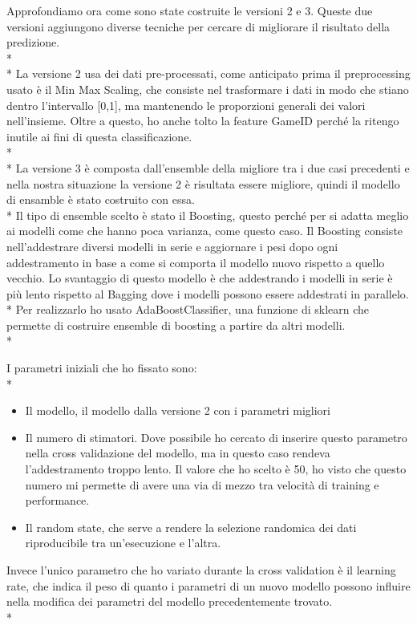 Approfondiamo ora come sono state costruite le versioni 2 e 3. Queste due versioni aggiungono diverse tecniche per cercare di migliorare il risultato della predizione.\\*\\*
La versione 2 usa dei dati pre-processati, come anticipato prima il preprocessing usato è il Min Max Scaling, che consiste nel trasformare i dati in modo che stiano dentro l'intervallo [0,1], ma mantenendo le proporzioni generali dei valori nell'insieme. Oltre a questo, ho anche tolto la feature GameID perché la ritengo inutile ai fini di questa classificazione. \\*\\*
La versione 3 è composta dall’ensemble della migliore tra i due casi precedenti e nella nostra situazione la versione 2 è risultata essere migliore, quindi il modello di ensamble è stato costruito con essa.\\*
Il tipo di ensemble scelto è stato il Boosting, questo perché per si adatta meglio ai modelli come che hanno poca varianza, come questo caso. Il Boosting consiste nell'addestrare diversi modelli in serie e aggiornare i pesi dopo ogni addestramento in base a come si comporta il modello nuovo rispetto a quello vecchio. Lo svantaggio di questo modello è che addestrando i modelli in serie è più lento rispetto al Bagging dove i modelli possono essere addestrati in parallelo.\\*
Per realizzarlo ho usato AdaBoostClassifier, una funzione di sklearn che permette di costruire ensemble di boosting a partire da altri modelli. \\*

I parametri iniziali che ho fissato sono: \\*
\begin{itemize}
	\item Il modello, il modello dalla versione 2 con i parametri migliori
	\item Il numero di stimatori. Dove possibile ho cercato di inserire questo parametro nella cross validazione del modello, ma in questo caso rendeva l'addestramento troppo lento. Il valore che ho scelto è 50, ho visto che questo numero mi permette di avere una via di mezzo tra velocità di training e performance.
	\item Il random state, che serve a rendere la selezione randomica dei dati riproducibile tra un'esecuzione e l'altra.
\end{itemize}

Invece l'unico parametro che ho variato durante la cross validation è il learning rate, che indica il peso di quanto i parametri di un nuovo modello possono influire nella modifica dei parametri del modello precedentemente trovato.\\*

